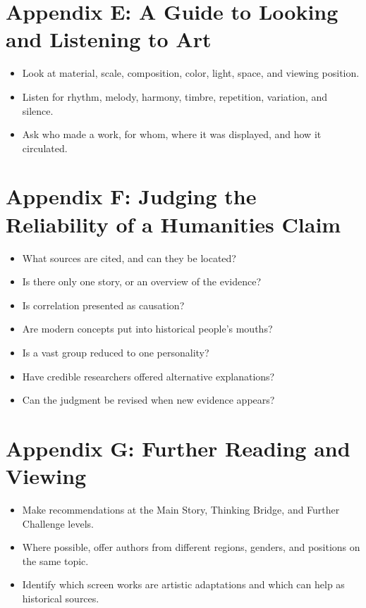 \section*{Appendix E: A Guide to Looking and Listening to Art}
\begin{itemize}
\item Look at material, scale, composition, color, light, space, and viewing position.
\item Listen for rhythm, melody, harmony, timbre, repetition, variation, and silence.
\item Ask who made a work, for whom, where it was displayed, and how it circulated.
\end{itemize}
\section*{Appendix F: Judging the Reliability of a Humanities Claim}
\begin{itemize}
\item What sources are cited, and can they be located?
\item Is there only one story, or an overview of the evidence?
\item Is correlation presented as causation?
\item Are modern concepts put into historical people's mouths?
\item Is a vast group reduced to one personality?
\item Have credible researchers offered alternative explanations?
\item Can the judgment be revised when new evidence appears?
\end{itemize}
\section*{Appendix G: Further Reading and Viewing}
\begin{itemize}
\item Make recommendations at the Main Story, Thinking Bridge, and Further Challenge levels.
\item Where possible, offer authors from different regions, genders, and positions on the same topic.
\item Identify which screen works are artistic adaptations and which can help as historical sources.
\end{itemize}
